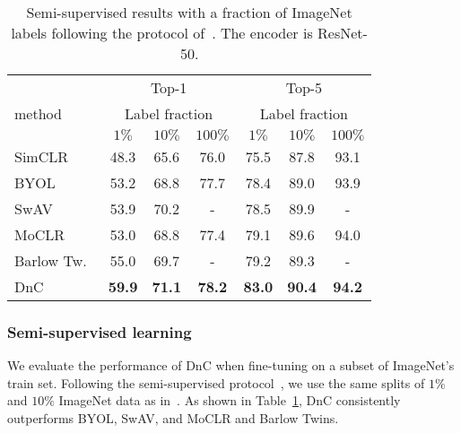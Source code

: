 \documentclass[final]{cvpr}
\newcommand\baseline{MoCLR}
\begin{document}
\begin{table}[t]
\caption{Semi-supervised results with a fraction of ImageNet labels following the protocol of~\cite{chen2020simple,grill2020bootstrap}. The encoder is ResNet-50.}
\vspace{-5pt}
\label{tab:semi_results}
\setlength{\tabcolsep}{4.5pt}
\begin{center}
\begin{small}
\begin{tabular}{lcccccc}
\toprule
 & \multicolumn{3}{c}{Top-1} & \multicolumn{3}{c}{Top-5}\\
method & \multicolumn{3}{c}{Label fraction} & \multicolumn{3}{c}{Label fraction}\\
 & $1\%$ & $10\%$ & $100\%$ & $1\%$ & $10\%$ & $100\%$ \\
\midrule
SimCLR~\cite{chen2020simple}     & 48.3 & 65.6 & 76.0    & 75.5 & 87.8 & 93.1 \\
BYOL~\cite{grill2020bootstrap}       & 53.2 & 68.8 & 77.7    & 78.4 & 89.0 & 93.9 \\
SwAV~\cite{caron2020unsupervised}    & 53.9 & 70.2 & -    & 78.5 & 89.9 & - \\
\baseline{}& 53.0 & 68.8 & 77.4    & 79.1 & 89.6 & 94.0 \\
Barlow Tw.~\cite{zbontar2021barlow} & 55.0 & 69.7 & - & 79.2 & 89.3 & - \\ 
DnC        & \cellcolor{DnCBG}\textbf{59.9} & \cellcolor{DnCBG}\textbf{71.1} & \cellcolor{DnCBG}\textbf{78.2} & \cellcolor{DnCBG}\textbf{83.0} & \cellcolor{DnCBG}\textbf{90.4} & \cellcolor{DnCBG}\textbf{94.2} \\
\bottomrule
\end{tabular}
\end{small}
\end{center}
\vspace{-15pt}
\end{table} \subsubsection{Semi-supervised learning}
We evaluate the performance of DnC when fine-tuning on a subset of ImageNet's train set. Following the semi-supervised protocol~\cite{kornblith2019better,zhai2019s4l,chen2020simple,grill2020bootstrap}, we use the same splits of $1\%$ and $10\%$ ImageNet data as in~\cite{chen2020simple,grill2020bootstrap}. As shown in Table~\ref{tab:semi_results}, DnC consistently outperforms BYOL, SwAV, and MoCLR and Barlow Twins. 
\end{document}
